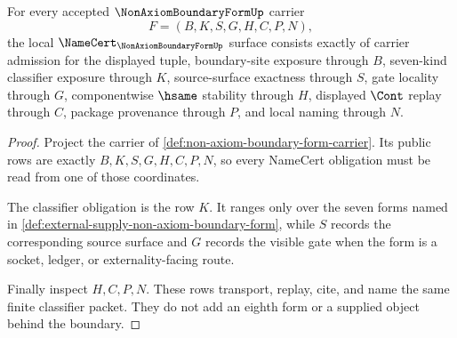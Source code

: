 \begin{theorem}
\label{thm:non-axiom-boundary-form-namecert-obligations}
For every accepted $\NonAxiomBoundaryFormUp$ carrier
$$
F=(B,K,S,G,H,C,P,N),
$$
the local $\NameCert_{\NonAxiomBoundaryFormUp}$ surface consists exactly of carrier admission for the displayed tuple, boundary-site exposure through $B$, seven-kind classifier exposure through $K$, source-surface exactness through $S$, gate locality through $G$, componentwise $\hsame$ stability through $H$, displayed $\Cont$ replay through $C$, package provenance through $P$, and local naming through $N$.
\end{theorem}
\begin{proof}
Project the carrier of \autoref{def:non-axiom-boundary-form-carrier}. Its public rows are exactly $B,K,S,G,H,C,P,N$, so every NameCert obligation must be read from one of those coordinates.

The classifier obligation is the row $K$. It ranges only over the seven forms named in \autoref{def:external-supply-non-axiom-boundary-form}, while $S$ records the corresponding source surface and $G$ records the visible gate when the form is a socket, ledger, or externality-facing route.

Finally inspect $H,C,P,N$. These rows transport, replay, cite, and name the same finite classifier packet. They do not add an eighth form or a supplied object behind the boundary.
\end{proof}

